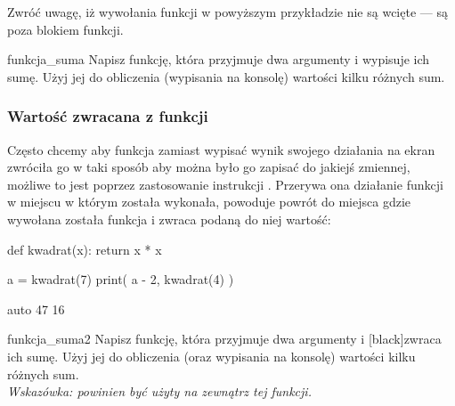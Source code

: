 \documentclass{pdfBooklets}
\begin{document}
\noindent
Zwróć uwagę, iż wywołania funkcji w powyższym przykładzie nie są wcięte --- są poza blokiem funkcji.


\begin{Zadanie}{}{funkcja_suma}
Napisz funkcję, która przyjmuje dwa argumenty i wypisuje ich sumę. Użyj jej do obliczenia (wypisania na konsolę) wartości kilku różnych sum.
\end{Zadanie}

\subsubsection{Wartość zwracana z funkcji}

Często chcemy aby funkcja zamiast wypisać wynik swojego działania na ekran zwróciła go w taki sposób aby można było go zapisać do jakiejś zmiennej,
możliwe to jest poprzez zastosowanie instrukcji . Przerywa ona działanie funkcji w miejscu w którym została wykonała,
powoduje powrót do miejsca gdzie wywołana została funkcja i zwraca podaną do niej wartość:

\begin{CodeFrame}[python]{.5\textwidth}
def kwadrat(x):
  return x * x

a = kwadrat(7)
print( a - 2, kwadrat(4) )
\end{CodeFrame}
\begin{CodeFrame}{auto}
47 16
\end{CodeFrame}

\vspace{-13pt}

\begin{Zadanie}{}{funkcja_suma2}
Napisz funkcję, która przyjmuje dwa argumenty i \ul[black]{zwraca} ich sumę. Użyj jej do obliczenia (oraz wypisania na konsolę) wartości kilku różnych sum.
\\\textit{Wskazówka:  powinien być użyty na zewnątrz tej funkcji.}

\end{Zadanie}
\end{document}
